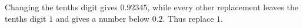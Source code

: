 Changing the tenths digit gives $0.92345$, while every other replacement leaves the tenths digit $1$ and gives a number below $0.2$. Thus replace $\boxed1$.
